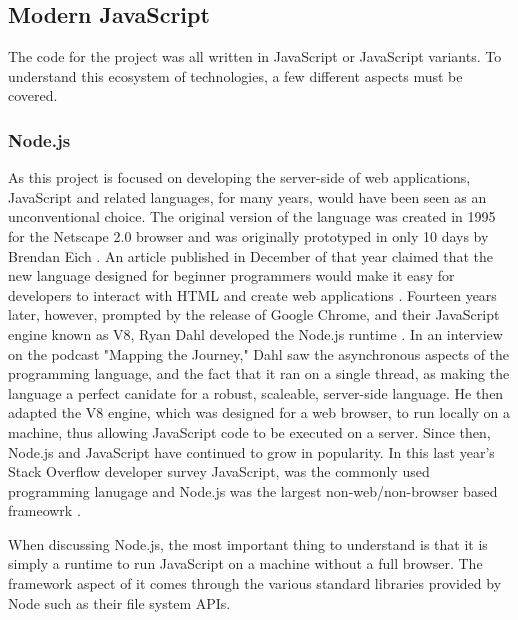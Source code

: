 \subsection{Modern JavaScript}

The code for the project was all written in JavaScript or JavaScript variants.  To understand this ecosystem of technologies, a few different aspects must be covered.

\subsubsection{Node.js}
As this project is focused on developing the server-side of web applications, JavaScript and related languages, for many years, would have been seen as an unconventional choice.  The original version of the language was created in 1995 for the Netscape 2.0 browser and was originally prototyped in only 10 days by Brendan Eich \cite{redhatinc.CreatingJavaScript}.  An article published in December of that year claimed that the new language designed for beginner programmers would make it easy for developers to interact with HTML and create web applications \cite{bucholtzNewLanguageAims1995}.  Fourteen years later, however, prompted by the release of Google Chrome, and their JavaScript engine known as V8, Ryan Dahl developed the Node.js runtime \cite{pramodEpisodeInterviewRyan}.  In an interview on the podcast "Mapping the Journey," Dahl saw the asynchronous aspects of the programming language, and the fact that it ran on a single thread, as making the language a perfect canidate for a robust, scaleable, server-side language.  He then adapted the V8 engine, which was designed for a web browser, to run locally on a machine, thus allowing JavaScript code to be executed on a server.
Since then, Node.js and JavaScript have continued to grow in popularity. In this last year's Stack Overflow developer survey JavaScript, was the commonly used programming lanugage and Node.js was the largest non-web/non-browser based frameowrk \cite{stackoverflowStackOverflowDeveloper}.

When discussing Node.js, the most important thing to understand is that it is simply a runtime to run JavaScript on a machine without a full browser.  The framework aspect of it comes through the various standard libraries provided by Node such as their file system APIs.

